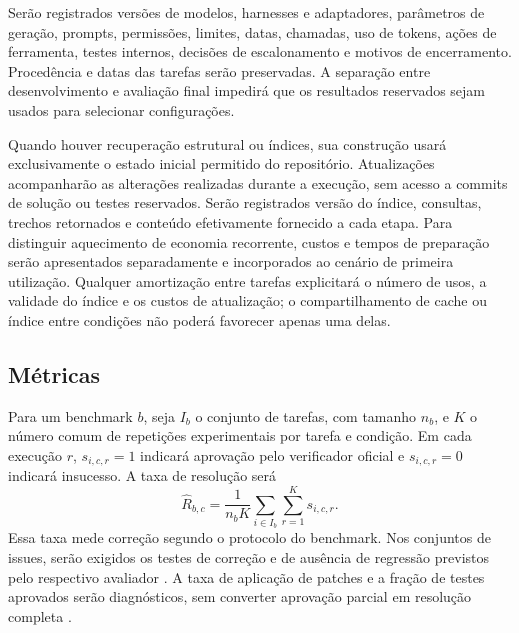 Serão registrados versões de modelos, harnesses e adaptadores, parâmetros de geração, prompts, permissões, limites, datas, chamadas, uso de tokens, ações de ferramenta, testes internos, decisões de escalonamento e motivos de encerramento. Procedência e datas das tarefas serão preservadas. A separação entre desenvolvimento e avaliação final impedirá que os resultados reservados sejam usados para selecionar configurações.

Quando houver recuperação estrutural ou índices, sua construção usará exclusivamente o estado inicial permitido do repositório. Atualizações acompanharão as alterações realizadas durante a execução, sem acesso a commits de solução ou testes reservados. Serão registrados versão do índice, consultas, trechos retornados e conteúdo efetivamente fornecido a cada etapa. Para distinguir aquecimento de economia recorrente, custos e tempos de preparação serão apresentados separadamente e incorporados ao cenário de primeira utilização. Qualquer amortização entre tarefas explicitará o número de usos, a validade do índice e os custos de atualização; o compartilhamento de cache ou índice entre condições não poderá favorecer apenas uma delas.

\subsection{Métricas}

Para um benchmark $b$, seja $I_b$ o conjunto de tarefas, com tamanho $n_b$, e $K$ o número comum de repetições experimentais por tarefa e condição. Em cada execução $r$, $s_{i,c,r}=1$ indicará aprovação pelo verificador oficial e $s_{i,c,r}=0$ indicará insucesso. A taxa de resolução será
\begin{equation}
\widehat{R}_{b,c}=\frac{1}{n_bK}\sum_{i\in I_b}\sum_{r=1}^{K}s_{i,c,r}.
\end{equation}
Essa taxa mede correção segundo o protocolo do benchmark. Nos conjuntos de issues, serão exigidos os testes de correção e de ausência de regressão previstos pelo respectivo avaliador \cite{Jimenez2024SWEbench}. A taxa de aplicação de patches e a fração de testes aprovados serão diagnósticos, sem converter aprovação parcial em resolução completa \cite{Zhou2026FeatureBench}.

